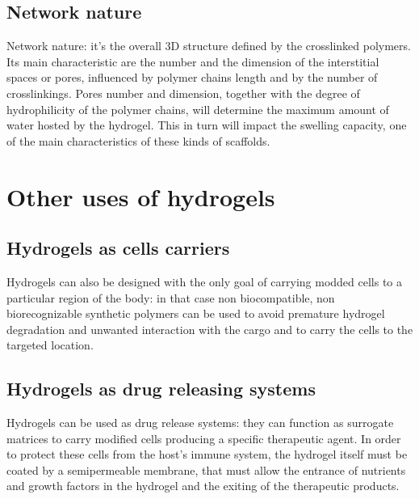 	\subsection{Network nature}
	Network nature: it’s the overall 3D structure defined by the crosslinked polymers.
	Its main characteristic are the number and the dimension of the interstitial spaces or pores, influenced by polymer chains length and by the number of crosslinkings.
	Pores number and dimension, together with the degree of hydrophilicity of the polymer chains, will determine the maximum amount of water hosted by the hydrogel.
	This in turn will impact the swelling capacity, one of the main characteristics of these kinds of scaffolds.

\section{Other uses of hydrogels}

	\subsection{Hydrogels as cells carriers}
	Hydrogels can also be designed with the only goal of carrying modded cells to a particular region of the body: in that case non biocompatible, non biorecognizable synthetic polymers can be used to avoid premature hydrogel degradation and unwanted interaction with the cargo and to carry the cells to the targeted location.

	\subsection{Hydrogels as drug releasing systems}
	Hydrogels can be used as drug release systems: they can function as surrogate matrices to carry modified cells producing a specific therapeutic agent.
	In order to protect these cells from the host’s immune system, the hydrogel itself must be coated by a semipermeable membrane, that must allow the entrance of nutrients and growth factors in the hydrogel and the exiting of the therapeutic products.
